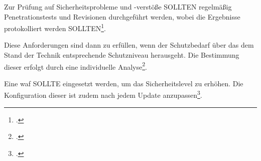 	Zur Prüfung auf Sicherheitsprobleme und -verstöße SOLLTEN regelmäßig Penetrationstests
	und Revisionen durchgeführt werden,
	wobei die Ergebnisse protokolliert werden SOLLTEN\footcite[Vgl.][APP.3.1 S. 5]{holgerschildt2022}.

	Diese Anforderungen sind dann zu erfüllen,
	wenn der Schutzbedarf über das dem Stand der Technik entsprechende Schutzniveau herausgeht.
	Die Bestimmung dieser erfolgt durch
	eine individuelle Analyse\footcite[Vgl.][APP.3.1 S. 5]{holgerschildt2022}.

	Eine \gls{waf} SOLLTE eingesetzt werden,
	um das Sicherheitslevel zu erhöhen.
	Die Konfiguration dieser ist zudem
	nach jedem Update anzupassen\footcite[Vgl.][APP.3.1 S. 5]{holgerschildt2022}.